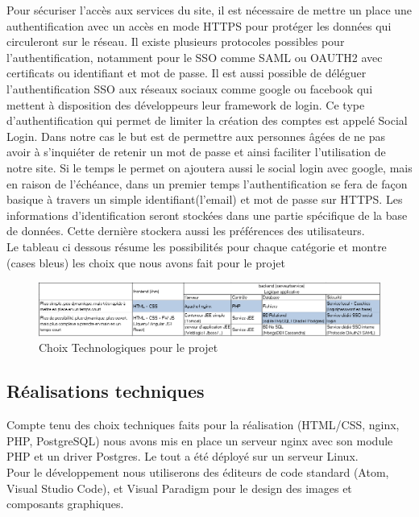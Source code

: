 \documentclass[a4paper,11pt]{article}
\begin{document}
Pour sécuriser l’accès aux services du site, il est nécessaire de mettre un place une authentification
avec un accès en mode HTTPS pour protéger les données qui circuleront sur le réseau. Il existe
plusieurs protocoles possibles pour l’authentification, notamment pour le SSO comme SAML ou
OAUTH2 avec certificats ou identifiant et mot de passe. Il est aussi possible de déléguer l'authentification
SSO aux réseaux sociaux comme google ou facebook qui mettent à disposition des développeurs leur framework de login.
Ce type d'authentification qui permet de limiter la création des comptes est appelé Social Login.
Dans notre cas le but est de permettre aux personnes âgées de ne pas avoir à s’inquiéter de retenir un mot
de passe et ainsi faciliter l’utilisation de notre site. Si le temps le permet on ajoutera aussi le social login
avec google, mais en raison de l’échéance, dans un premier temps l’authentification se fera de façon basique à
travers un simple identifiant(l'email) et mot de passe sur HTTPS. Les informations d’identification seront stockées
dans une partie spécifique de la base de données. Cette dernière stockera aussi les préférences des utilisateurs. \\

Le tableau ci dessous résume les possibilités pour chaque catégorie et montre (cases bleus)
les choix que nous avons fait pour le projet \\

\begin{figure}[H]
  \includegraphics[width=\linewidth]{images/choixTechno.PNG}
  \caption{Choix Technologiques pour le projet}
  \label{fig:choix-techno}
\end{figure}

\subsection{Réalisations techniques}

Compte tenu des choix techniques faits pour la réalisation (HTML/CSS, nginx, PHP, PostgreSQL) nous avons
mis en place un serveur nginx avec son module PHP et un driver Postgres. Le tout a été déployé
sur un serveur Linux.\\

Pour le développement nous utiliserons des éditeurs de code standard (Atom, Visual Studio Code), et Visual Paradigm
pour le design des images et composants graphiques.\\
\end{document}
